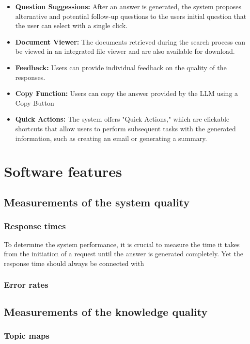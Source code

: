 \documentclass[
	english,
	ruledheaders=section,%
	class=report,%
	thesis={type=bachelor},%
	accentcolor=1b,%
	custommargins=true,%
	marginpar=false,%
	parskip=half-,%
	fontsize=11pt,%
	DIV=14,
]{tudapub}
\begin{document}
\begin{itemize}
    \item \textbf{Question Suggessions:} After an answer is generated, the system proposes alternative and potential follow-up questions to the users initial question that the user can select with a single click.
    
    \item \textbf{Document Viewer:} The documents retrieved during the search process can be viewed in an integrated file viewer and are also available for download.
    
    \item \textbf{Feedback:} Users can provide individual feedback on the quality of the responses.

    \item \textbf{Copy Function:} Users can copy the answer provided by the LLM using a Copy Button
    
    \item \textbf{Quick Actions:} The system offers "Quick Actions," which are clickable shortcuts that allow users to perform subsequent tasks with the generated information, such as creating an email or generating a summary.
\end{itemize}
\section{Software features}
\subsection{Measurements of the system quality}
\subsubsection{Response times}
To determine the system performance, it is crucial to measure the time it takes from the initiation of a request until the answer is generated completely. Yet the response time should always be connected with 
\subsubsection{Error rates}
\subsection{Measurements of the knowledge quality}
\subsubsection{Topic maps}
\end{document}
